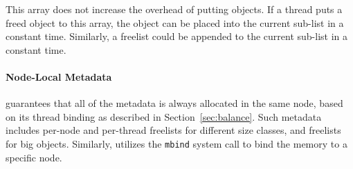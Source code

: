 
This array does not increase the overhead of putting objects. If a thread puts a freed object to this array, the object can be placed into the current sub-list in a constant time. Similarly, a freelist could be appended to the current sub-list in a constant time. 

\paragraph{Node-Local Metadata} \NM{} guarantees that all of the metadata is always allocated in the same node, based on its thread binding as described in Section~\ref{sec:balance}. Such metadata includes per-node and per-thread freelists for different size classes, and freelists for big objects. Similarly, \NM{} utilizes the \texttt{mbind} system call to bind the memory to a specific node.  


